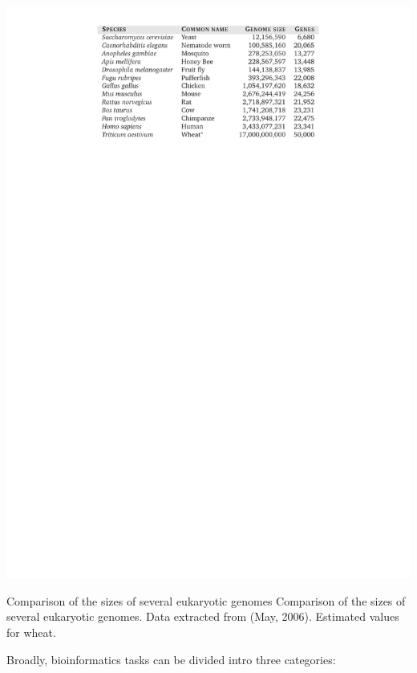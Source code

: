 \begin{table}[t!]
\begin{center}
\begin{minipage}{0.98\linewidth}\setlength{\parindent}{0pt}
\begin{center}
\includegraphics[bb=131 645 466 815,clip]{tables/gsizes}
\end{center}
\end{minipage}
          {Comparison of the sizes of several eukaryotic genomes}%
          {Comparison of the sizes of several eukaryotic genomes.}%
          {Data extracted from \ensembl{} (May, 2006). Estimated values for wheat.}
\end{center}
\end{table}

\noindent Broadly, bioinformatics tasks can be divided intro three categories:

